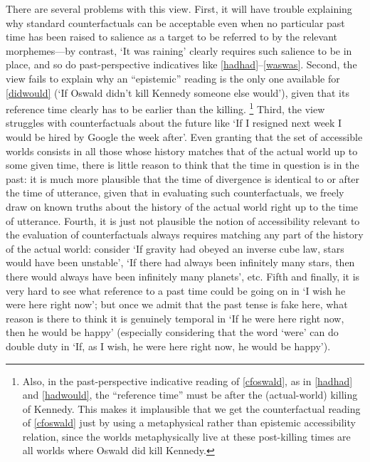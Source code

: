 \documentclass[If.tex]{subfiles}
\begin{document}
There are several problems with this view. First, it will have trouble explaining why standard counterfactuals can be acceptable even when no particular past time has been raised to salience as a target to be referred to by the relevant morphemes---by contrast, ‘It was raining’ clearly requires such salience to be in place, and so do past-perspective indicatives like \ref{hadhad}--\ref{waswas}.  Second, the view fails to explain why an “epistemic” reading is the only one available for \ref{didwould} (‘If Oswald didn't kill Kennedy someone else would’), given that its reference time clearly has to be earlier than the killing.%
\footnote{Also, in the past-perspective indicative reading of \ref{cfoswald}, as in \ref{hadhad} and \ref{hadwould}, the “reference time” must be after the (actual-world) killing of Kennedy. This makes it implausible that we get the counterfactual reading of \ref{cfoswald} just by using a metaphysical rather than epistemic accessibility relation, since the worlds metaphysically live at these post-killing times are all worlds where Oswald did kill Kennedy.}
Third, the view struggles with counterfactuals about the future like ‘If I resigned next week I would be hired by Google the week after’. Even granting that the set of accessible worlds consists in all those whose history matches that of the actual world up to some given time, there is little reason to think that the time in question is in the past: it is much more plausible that the time of divergence is identical to or after the time of utterance, given that in evaluating such counterfactuals, we freely draw on known truths about the history of the actual world right up to the time of utterance. Fourth, it is just not plausible the notion of accessibility relevant to the evaluation of counterfactuals always requires matching any part of the history of the actual world: consider ‘If gravity had obeyed an inverse cube law, stars would have been unstable’, ‘If there had always been infinitely many stars, then there would always have been infinitely many planets’, etc. Fifth and finally, it is very hard to see what reference to a past time could be going on in ‘I wish he were here right now’; but once we admit that the past tense is fake here, what reason is there to think it is genuinely temporal in ‘If he were here right now, then he would be happy’ (especially considering that the word ‘were’ can do double duty in ‘If, as I wish, he were here right now, he would be happy’).%
\end{document}
